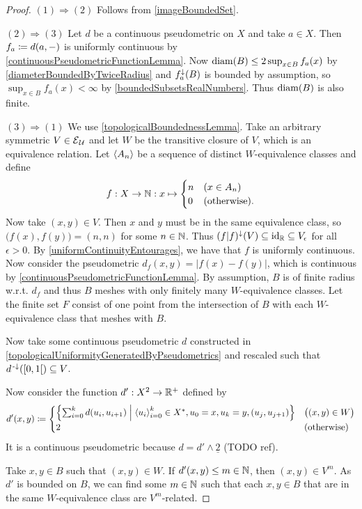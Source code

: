 \begin{proof}
$(1) \Rightarrow (2)$ Follows from \ref{imageBoundedSet}.

$(2) \Rightarrow (3)$ Let $d$ be a continuous pseudometric on $X$ and take $a\in X$. Then $f_a \coloneqq d(a,-)$ is uniformly continuous by \ref{continuousPseudometricFunctionLemma}. Now $\operatorname{diam}(B)\leq 2\sup_{x\in B}f_a(x)$ by \ref{diameterBoundedByTwiceRadius} and $f_a^\downarrow(B)$ is bounded by assumption, so $\sup_{x\in B}f_a(x) < \infty $ by \ref{boundedSubsetsRealNumbers}. Thus $\operatorname{diam}(B)$ is also finite.

$(3) \Rightarrow (1)$ We use \ref{topologicalBoundednessLemma}. Take an arbitrary symmetric $V\in \operatorname{\mathcal{E}}_\mathcal{U}$ and let $W$ be the transitive closure of $V$, which is an equivalence relation. Let $\left\langle A_n \right\rangle$ be a sequence of distinct $W$-equivalence classes and define
\[ f: X\to \mathbb{N}: x\mapsto \begin{cases}
n & (x\in A_n) \\
0 & (\text{otherwise}).
\end{cases} \]
Now take $(x,y)\in V$. Then $x$ and $y$ must be in the same equivalence class, so $\big(f(x), f(y)\big) = (n,n)$ for some $n\in\mathbb{N}$. Thus $(f|f)^\downarrow(V)\subseteq \operatorname{id}_{\mathbb{R}} \subseteq V_\epsilon$ for all $\epsilon>0$. By \ref{uniformContinuityEntourages}, we have that $f$ is uniformly continuous. Now consider the pseudometric $d_f(x,y) = |f(x)-f(y)|$, which is continuous by \ref{continuousPseudometricFunctionLemma}. By assumption, $B$ is of finite radius w.r.t. $d_f$ and thus $B$ meshes with only finitely many $W$-equivalence classes. Let the finite set $F$ consist of one point from the intersection of $B$ with each $W$-equivalence class that meshes with $B$.

Now take some continuous pseudometric $d$ constructed in \ref{topologicalUniformityGeneratedByPseudometrics} and rescaled such that $d^\preimf(\interval[co]{0,1}) \subseteq V$.

Now consider the function $d': X^2\to \mathbb{R}^+$ defined by
\[ d'(x,y) \defeq \begin{cases}
\setbuilder{\sum_{i=0}^kd(u_i, u_{i+1})}{\seq{u_i}_{i=0}^k\in X^*, u_0 = x, u_k = y, (u_{j},u_{j+1})} & \big((x,y)\in W\big) \\
2 & (\text{otherwise})
\end{cases} \]
It is a continuous pseudometric because $d = d'\wedge \underline{2}$ (TODO ref).

Take $x,y\in B$ such that $(x,y)\in W$. If $d'(x,y)\leq m\in\mathbb{N}$, then $(x,y)\in V^m$. As $d'$ is bounded on $B$, we can find some $m\in \mathbb{N}$ such that each $x,y\in B$ that are in the same $W$-equivalence class are $V^m$-related.
\end{proof}

